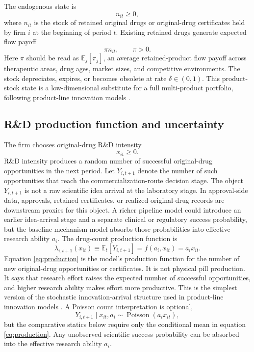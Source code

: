 \documentclass[12pt]{article}
\newcommand{\E}{\mathbb{E}}
\newcommand{\1}{\mathbf{1}}
\begin{document}
The endogenous state is
\begin{equation}
    n_{it}\ge0,
    \label{eq:state}
\end{equation}
where $n_{it}$ is the stock of retained original drugs or original-drug certificates held by firm $i$ at the beginning of period $t$. Existing retained drugs generate expected flow payoff
\begin{equation}
    \pi n_{it},\qquad \pi>0.
    \label{eq:oldflow}
\end{equation}
Here $\pi$ should be read as $\E_j[\pi_j]$, an average retained-product flow payoff across therapeutic areas, drug ages, market sizes, and competitive environments. The stock depreciates, expires, or becomes obsolete at rate $\delta\in(0,1)$. This product-stock state is a low-dimensional substitute for a full multi-product portfolio, following product-line innovation models \citep{KletteKortum2004}.

\subsection{R\&D production function and uncertainty}

The firm chooses original-drug R\&D intensity
\begin{equation}
    x_{it}\ge0.
    \label{eq:rdintensity}
\end{equation}
R\&D intensity produces a random number of successful original-drug opportunities in the next period. Let $Y_{i,t+1}$ denote the number of such opportunities that reach the commercialization-route decision stage. The object $Y_{i,t+1}$ is not a raw scientific idea arrival at the laboratory stage. In approval-side data, approvals, retained certificates, or realized original-drug records are downstream proxies for this object. A richer pipeline model could introduce an earlier idea-arrival stage and a separate clinical or regulatory success probability, but the baseline mechanism model absorbs those probabilities into effective research ability $a_i$. The drug-count production function is
\begin{equation}
    \lambda_{i,t+1}(x_{it})\equiv \E_t[Y_{i,t+1}]=f(a_i,x_{it})=a_i x_{it}.
    \label{eq:production}
\end{equation}
Equation \eqref{eq:production} is the model's production function for the number of new original-drug opportunities or certificates. It is not physical pill production. It says that research effort raises the expected number of successful opportunities, and higher research ability makes effort more productive. This is the simplest version of the stochastic innovation-arrival structure used in product-line innovation models \citep{KletteKortum2004}. A Poisson count interpretation is optional,
\begin{equation}
    Y_{i,t+1}\mid x_{it},a_i\sim \operatorname{Poisson}(a_i x_{it}),
    \label{eq:poisson}
\end{equation}
but the comparative statics below require only the conditional mean in equation \eqref{eq:production}. Any unobserved scientific success probability can be absorbed into the effective research ability $a_i$.
\end{document}
